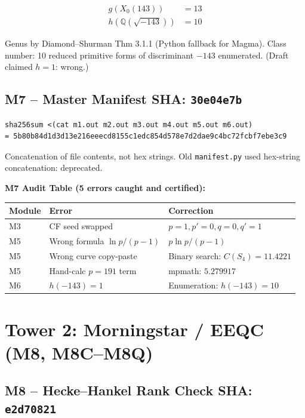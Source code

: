 \documentclass[12pt,letterpaper]{article}
\begin{document}
\begin{align}
  g(X_0(143)) &= 13  \label{eq:genus143}\\
  h(\mathbb{Q}(\sqrt{-143})) &= 10  \label{eq:classnumber}
\end{align}

Genus by Diamond--Shurman Thm 3.1.1 (Python fallback for Magma).
Class number: 10 reduced primitive forms of discriminant $-143$ enumerated.
(Draft claimed $h = 1$: wrong.)

\subsection{M7 -- Master Manifest \hfill SHA: \texttt{30e04e7b}}

\begin{verbatim}
sha256sum <(cat m1.out m2.out m3.out m4.out m5.out m6.out)
= 5b80b84d1d3d13e216eeecd8155c1edc854d578e7d2dae9c4bc72fcbf7ebe3c9
\end{verbatim}

Concatenation of file contents, not hex strings.
Old \texttt{manifest.py} used hex-string concatenation: deprecated.

\noindent\textbf{M7 Audit Table (5 errors caught and certified):}

\begin{center}
\begin{tabular}{lll}
\toprule
Module & Error & Correction \\
\midrule
M3 & CF seed swapped & $p=1,p'=0,q=0,q'=1$ \\
M5 & Wrong formula $\ln p/(p-1)$ & $p \ln p/(p-1)$ \\
M5 & Wrong curve copy-paste & Binary search: $C(S_4) = 11.4221$ \\
M5 & Hand-calc $p=191$ term & mpmath: $5.279917$ \\
M6 & $h(-143) = 1$ & Enumeration: $h(-143) = 10$ \\
\bottomrule
\end{tabular}
\end{center}

\newpage
\section{Tower 2: Morningstar / EEQC (M8, M8C--M8Q)}

\subsection{M8 -- Hecke--Hankel Rank Check \hfill SHA: \texttt{e2d70821}}
\end{document}
